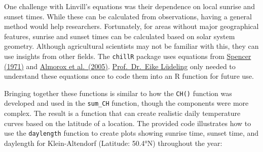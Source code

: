 \documentclass[
]{article}
\newenvironment{Shaded}{\begin{snugshade}}{\end{snugshade}}
\newcommand{\AttributeTok}[1]{\textcolor[rgb]{0.13,0.29,0.53}{#1}}
\newcommand{\DecValTok}[1]{\textcolor[rgb]{0.00,0.00,0.81}{#1}}
\newcommand{\FloatTok}[1]{\textcolor[rgb]{0.00,0.00,0.81}{#1}}
\newcommand{\FunctionTok}[1]{\textcolor[rgb]{0.13,0.29,0.53}{\textbf{#1}}}
\newcommand{\NormalTok}[1]{#1}
\newcommand{\OtherTok}[1]{\textcolor[rgb]{0.56,0.35,0.01}{#1}}
\newcommand{\SpecialCharTok}[1]{\textcolor[rgb]{0.81,0.36,0.00}{\textbf{#1}}}
\newcommand{\StringTok}[1]{\textcolor[rgb]{0.31,0.60,0.02}{#1}}
\begin{document}
One challenge with Linvill's equations was their dependence on local sunrise and sunset times. While these can be calculated from observations, having a general method would help researchers. Fortunately, for areas without major geographical features, sunrise and sunset times can be calculated based on solar system geometry. Although agricultural scientists may not be familiar with this, they can use insights from other fields. The \texttt{chillR} package uses equations from \href{https://www.mail-archive.com/sundial@uni-koeln.de/msg01050.html}{Spencer (1971)} and \href{https://www.sciencedirect.com/science/article/abs/pii/S0196890404001992}{Almorox et al.~(2005)}. \href{https://inresgb-lehre.iaas.uni-bonn.de/author/prof.-dr.-eike-luedeling/}{Prof.~Dr.~Eike Lüdeling} only needed to understand these equations once to code them into an R function for future use.

Bringing together these functions is similar to how the \texttt{CH()} function was developed and used in the \texttt{sum\_CH} function, though the components were more complex. The result is a function that can create realistic daily temperature curves based on the latitude of a location. The provided code illustrates how to use the \texttt{daylength} function to create plots showing sunrise time, sunset time, and daylength for Klein-Altendorf (Latitude: 50.4°N) throughout the year:

\begin{Shaded}
\end{Shaded}
\end{document}
